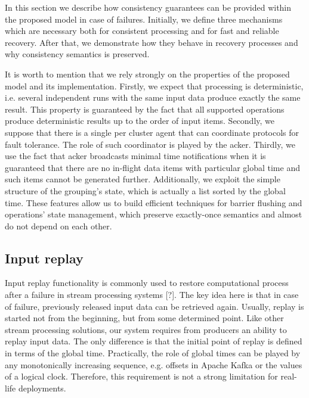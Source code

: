 
\label {fs-consistency-seciton}

In this section we describe how consistency guarantees can be provided within the proposed model in case of failures. Initially, we define three mechanisms which are necessary both for consistent processing and for fast and reliable recovery. After that, we demonstrate how they behave in recovery processes and why consistency semantics is preserved.

It is worth to mention that we rely strongly on the properties of the proposed model and its implementation. Firstly, we expect that processing is deterministic, i.e. several independent runs with the same input data produce exactly the same result. This property is guaranteed by the fact that all supported operations produce deterministic results up to the order of input items. Secondly, we suppose that there is a single per cluster agent that can coordinate protocols for fault tolerance. The role of such coordinator is played by the acker. Thirdly, we use the fact that acker broadcasts minimal time notifications when it is guaranteed that there are no in-flight data items with particular global time and such items cannot be generated further. Additionally, we exploit the simple structure of the grouping's state, which is actually a list sorted by the global time. These features allow us to build efficient techniques for barrier flushing and operations' state management, which preserve exactly-once semantics and almost do not depend on each other.  

\subsection{Input replay}
Input replay functionality is commonly used to restore computational process after a failure in stream processing systems [?]. The key idea here is that in case of failure, previously released input data can be retrieved again. Usually, replay is started not from the beginning, but from some determined point. Like other stream processing solutions, our system requires from producers an ability to replay input data. The only difference is that the initial point of replay is defined in terms of the global time. Practically, the role of global times can be played by any monotonically increasing sequence, e.g. offsets in Apache Kafka or the values of a logical clock. Therefore, this requirement is not a strong limitation for real-life deployments.

